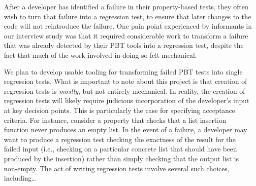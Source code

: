 

After a developer has identified a failure in their
property-based tests, they often wish to turn that failure
into a regression test, to ensure that later changes to the
code will not reintroduce the failure. One pain point
experienced by informants in our interview study was that it
required considerable work to transform a failure that was
already detected by their PBT tools into a regression test,
despite the fact that much of the work involved in doing so
felt mechanical.

We plan to develop usable tooling for transforming failed
PBT tests into single regression tests. What is important to
note about this project is that creation of regression tests
is \emph{mostly}, but not entirely mechanical. In reality,
the creation of regression tests will likely require
judicious incorporation of the developer's input at key
decision points. This is particularly the case for
specifying acceptance criteria. For instance, consider a
property that checks that a list insertion function never
produces an empty list. In the event of a failure, a
developer may want to produce a regression test checking the
exactness of the result for the failed input (i.e., checking
on a particular concrete list that should have been produced
by the insertion) rather than simply checking that the
output list is non-empty. The act of writing regression
tests involve several such choices, including\ldots{} 

 

\ifdraft
{}

